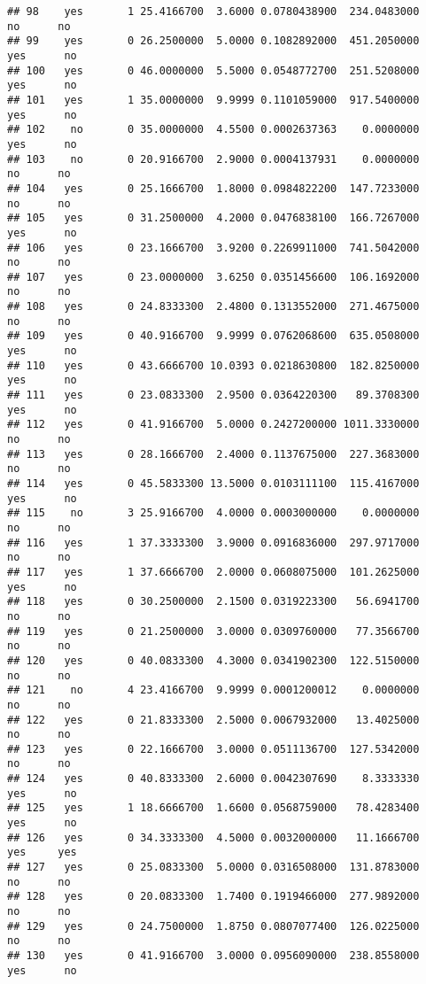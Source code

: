 \documentclass[]{article}
\begin{document}
\begin{verbatim}
## 98    yes       1 25.4166700  3.6000 0.0780438900  234.0483000    no      no
## 99    yes       0 26.2500000  5.0000 0.1082892000  451.2050000   yes      no
## 100   yes       0 46.0000000  5.5000 0.0548772700  251.5208000   yes      no
## 101   yes       1 35.0000000  9.9999 0.1101059000  917.5400000   yes      no
## 102    no       0 35.0000000  4.5500 0.0002637363    0.0000000   yes      no
## 103    no       0 20.9166700  2.9000 0.0004137931    0.0000000    no      no
## 104   yes       0 25.1666700  1.8000 0.0984822200  147.7233000    no      no
## 105   yes       0 31.2500000  4.2000 0.0476838100  166.7267000   yes      no
## 106   yes       0 23.1666700  3.9200 0.2269911000  741.5042000    no      no
## 107   yes       0 23.0000000  3.6250 0.0351456600  106.1692000    no      no
## 108   yes       0 24.8333300  2.4800 0.1313552000  271.4675000    no      no
## 109   yes       0 40.9166700  9.9999 0.0762068600  635.0508000   yes      no
## 110   yes       0 43.6666700 10.0393 0.0218630800  182.8250000   yes      no
## 111   yes       0 23.0833300  2.9500 0.0364220300   89.3708300   yes      no
## 112   yes       0 41.9166700  5.0000 0.2427200000 1011.3330000    no      no
## 113   yes       0 28.1666700  2.4000 0.1137675000  227.3683000    no      no
## 114   yes       0 45.5833300 13.5000 0.0103111100  115.4167000   yes      no
## 115    no       3 25.9166700  4.0000 0.0003000000    0.0000000    no      no
## 116   yes       1 37.3333300  3.9000 0.0916836000  297.9717000    no      no
## 117   yes       1 37.6666700  2.0000 0.0608075000  101.2625000   yes      no
## 118   yes       0 30.2500000  2.1500 0.0319223300   56.6941700    no      no
## 119   yes       0 21.2500000  3.0000 0.0309760000   77.3566700    no      no
## 120   yes       0 40.0833300  4.3000 0.0341902300  122.5150000    no      no
## 121    no       4 23.4166700  9.9999 0.0001200012    0.0000000    no      no
## 122   yes       0 21.8333300  2.5000 0.0067932000   13.4025000    no      no
## 123   yes       0 22.1666700  3.0000 0.0511136700  127.5342000    no      no
## 124   yes       0 40.8333300  2.6000 0.0042307690    8.3333330   yes      no
## 125   yes       1 18.6666700  1.6600 0.0568759000   78.4283400   yes      no
## 126   yes       0 34.3333300  4.5000 0.0032000000   11.1666700   yes     yes
## 127   yes       0 25.0833300  5.0000 0.0316508000  131.8783000    no      no
## 128   yes       0 20.0833300  1.7400 0.1919466000  277.9892000    no      no
## 129   yes       0 24.7500000  1.8750 0.0807077400  126.0225000    no      no
## 130   yes       0 41.9166700  3.0000 0.0956090000  238.8558000   yes      no

\end{verbatim}
\end{document}
